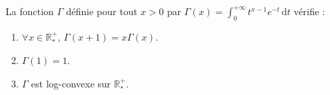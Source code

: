 






  \begin{lemma}
    \label{caracterisation-reelle-de-gamma-1}
    La fonction $\Gamma$ définie pour tout $x > 0$ par $\Gamma(x) = \int_0^{+\infty} t^{x-1} e^{-t} \, \mathrm{d}t$ vérifie :
    \begin{enumerate}[label={\bfseries(\roman*)}]
      \item \label{caracterisation-reelle-de-gamma-2} $\forall x \in \mathbb{R}^+_*$, $\Gamma(x+1) = x\Gamma(x)$.
      \item \label{caracterisation-reelle-de-gamma-3} $\Gamma(1) = 1$.
      \item \label{caracterisation-reelle-de-gamma-4} $\Gamma$ est log-convexe sur $\mathbb{R}^+_*$.
    \end{enumerate}
  \end{lemma}

